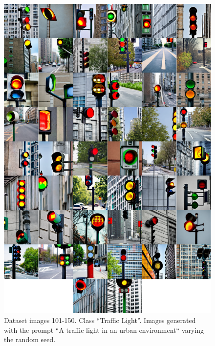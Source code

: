 \begin{figure}
    \centering
    \includegraphics[width=1\columnwidth]{img/6-appendix/dataset_example_traffic light.pdf}
    \caption[Dataset images 101-150]{Dataset images 101-150. Class ``Traffic Light''.  Images generated with the prompt ``A traffic light in an urban environment`` varying the random seed.}
    \label{fig:dataset-traffic}
\end{figure}


